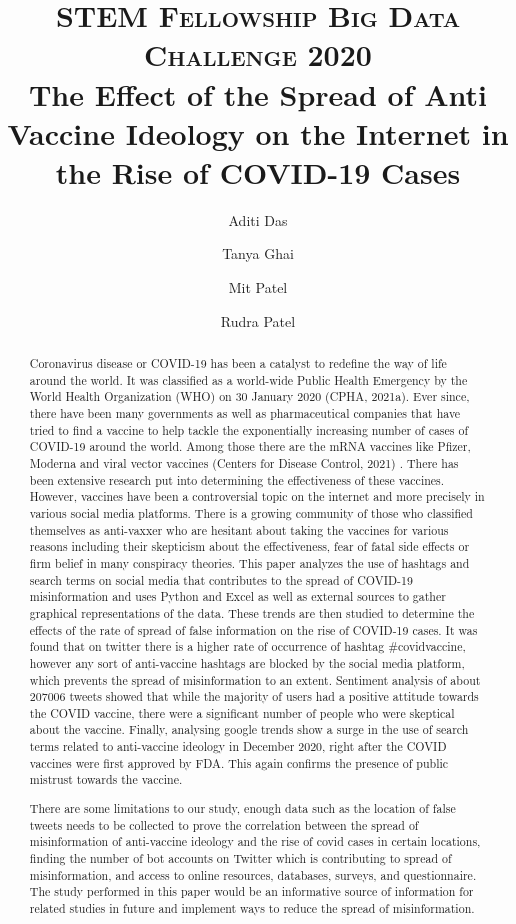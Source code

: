 \documentclass[10pt,twocolumn,letterpaper]{article}
\title{
		\usefont{OT1}{bch}{b}{n}
		\normalfont \normalsize \textsc{STEM Fellowship Big Data Challenge 2020} \\ [10pt]
		\huge The Effect of the Spread of Anti Vaccine Ideology on the Internet in the Rise of COVID-19 Cases \\
}
\author[1]{Aditi Das}
\author[1]{Tanya Ghai}
\author[1]{Mit Patel}
\author[2]{Rudra Patel}
\affil[1]{McMaster University, Hamilton, ON, Canada}
\begin{document}
\maketitle

\begin{abstract}

Coronavirus disease or COVID-19 has been a catalyst to redefine the way of life around the world. It was classified as a world-wide Public Health Emergency by the World Health Organization (WHO) on 30 January 2020 (CPHA, 2021a). Ever since, there have been many governments as well as pharmaceutical companies that have tried to find a vaccine to help tackle the exponentially increasing number of cases of COVID-19 around the world. Among those there are the mRNA vaccines like Pfizer, Moderna and viral vector vaccines (Centers for Disease Control, 2021) . There has been extensive research put into determining the effectiveness of these vaccines. However, vaccines have been a controversial topic on the internet and more precisely in various social media platforms. There is a growing community of those who classified themselves as anti-vaxxer who are hesitant about taking the vaccines for various reasons including their skepticism about the effectiveness, fear of fatal side effects or firm belief in many conspiracy theories. This paper analyzes the use of hashtags and search terms on social media that contributes to the spread of COVID-19 misinformation and uses Python and Excel as well as external sources to gather graphical representations of the data. These trends are then studied to determine the effects of the rate of spread of false information on the rise of COVID-19 cases. It was found that on twitter there is a higher rate of occurrence of hashtag #covidvaccine, however any sort of anti-vaccine hashtags are blocked by the social media platform, which prevents the spread of misinformation to an extent. Sentiment analysis of about 207006 tweets showed that while the majority of users had a positive attitude towards the COVID vaccine, there were a significant number of people who were skeptical about the vaccine. Finally, analysing google trends show a surge in the use of search terms related to anti-vaccine ideology in December 2020, right after the COVID vaccines were first approved by FDA. This again confirms the presence of public mistrust towards the vaccine. 
    
There are some limitations to our study, enough data such as the location of false tweets needs to be collected to prove the correlation between the spread of misinformation of anti-vaccine ideology and the rise of covid cases in certain locations, finding the number of bot accounts on Twitter which is contributing to spread of misinformation, and access to online resources, databases, surveys, and questionnaire.  The study performed in this paper would be an informative source of information for related studies in future and implement ways to reduce the spread of misinformation.


\end{abstract} \\ 
\end{document}
